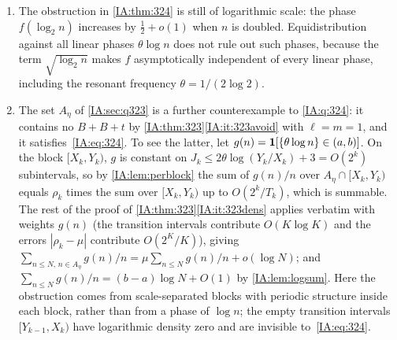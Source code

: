 \begin{remark}\label{IA:rem:324}
\begin{enumerate}[label=(\roman*)]
\item The obstruction in \cref{IA:thm:324} is still of logarithmic scale: the phase $f(\log_2n)$
increases by $\frac12+o(1)$ when $n$ is doubled. Equidistribution against all linear phases
$\theta\log n$ does not rule out such phases, because the term $\sqrt{\log_2n}$ makes $f$
asymptotically independent of every linear phase, including the resonant frequency
$\theta=1/(2\log2)$.
\item The set $A_\eta$ of \cref{IA:sec:q323} is a further counterexample to \cref{IA:q:324}: it
contains no $B+B+t$ by \cref{IA:thm:323}\ref{IA:it:323avoid} with $\ell=m=1$, and it
satisfies~\eqref{IA:eq:324}. To see the latter, let $g(n)=\mathbf{1}[\{\theta\log n\}\in(a,b)]$. On the
block $[X_k,Y_k)$, $g$ is constant on $J_k\le2\theta\log(Y_k/X_k)+3=O(2^k)$ subintervals, so by
\cref{IA:lem:perblock} the sum of $g(n)/n$ over $A_\eta\cap[X_k,Y_k)$ equals $\rho_k$ times the sum
over $[X_k,Y_k)$ up to $O(2^k/T_k)$, which is summable. The rest of the proof of
\cref{IA:thm:323}\ref{IA:it:323dens} applies verbatim with weights $g(n)$ (the transition intervals
contribute $O(K\log K)$ and the errors $|\rho_k-\mu|$ contribute $O(2^K/K)$), giving
$\sum_{n\le N,\,n\in A_\eta}g(n)/n=\mu\sum_{n\le N}g(n)/n+o(\log N)$; and
$\sum_{n\le N}g(n)/n=(b-a)\log N+O(1)$ by \cref{IA:lem:logsum}. Here the obstruction comes from scale-separated blocks with periodic structure inside each block,
rather than from a phase of $\log n$; the empty transition intervals $[Y_{k-1},X_k)$ have
logarithmic density zero and are invisible to~\eqref{IA:eq:324}.
\end{enumerate}
\end{remark}
